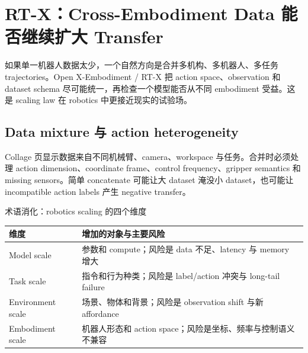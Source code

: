 \section{RT-X：Cross-Embodiment Data 能否继续扩大 Transfer}

如果单一机器人数据太少，一个自然方向是合并多机构、多机器人、多任务 trajectories。Open X-Embodiment / RT-X 把 action space、observation 和 dataset schema 尽可能统一，再检查一个模型能否从不同 embodiment 受益。这是 scaling law 在 robotics 中更接近现实的试验场。

\subsection{Data mixture 与 action heterogeneity}

Collage 页显示数据来自不同机械臂、camera、workspace 与任务。合并时必须处理 action dimension、coordinate frame、control frequency、gripper semantics 和 missing sensors。简单 concatenate 可能让大 dataset 淹没小 dataset，也可能让 incompatible action labels 产生 negative transfer。



\begin{knowledgebox}{术语消化：robotics scaling 的四个维度}
\begin{tabularx}{\textwidth}{@{}L{0.18\textwidth}X@{}}
\toprule
维度 & 增加的对象与主要风险 \\
\midrule
Model scale & 参数和 compute；风险是 data 不足、latency 与 memory 增大 \\
Task scale & 指令和行为种类；风险是 label/action 冲突与 long-tail failure \\
Environment scale & 场景、物体和背景；风险是 observation shift 与新 affordance \\
Embodiment scale & 机器人形态和 action space；风险是坐标、频率与控制语义不兼容 \\
\bottomrule
\end{tabularx}
\end{knowledgebox}


